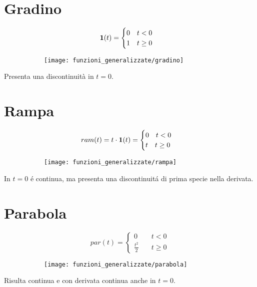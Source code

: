 \documentclass[../main.tex]{subfiles}
\begin{document}
	\section{Gradino}
		\begin{figure}[H]
			\centering
			\begin{subfigure}{0.4\textwidth}
				\[
					\textbf{1}(t) = 
					\begin{cases}
						0 \quad t<0
						\\
						1 \quad t \geq 0
					\end{cases}
				\]
			\end{subfigure}
			\begin{subfigure}{0.4\textwidth}
				\texttt{[image: funzioni\_generalizzate/gradino]}
			\end{subfigure}
		\end{figure}
		Presenta una discontinuità in $ t=0 $.
		
	\section{Rampa}
		\begin{figure}[H]
			\centering
			\begin{subfigure}{0.4\textwidth}
				\[
					ram(t)= t \cdot \textbf{1}(t) =
					\begin{cases}
						0 \quad t<0
						\\
						t \quad t \geq 0			
					\end{cases}
				\]
			\end{subfigure}
			\begin{subfigure}{0.4\textwidth}
				\texttt{[image: funzioni\_generalizzate/rampa]}
			\end{subfigure}
		\end{figure}
		In $ t=0 $ \'e continua, ma presenta una discontinuit\'a di prima specie nella derivata.
		
	\section{Parabola}
		\begin{figure}[H]
			\centering
			\begin{subfigure}{0.4\textwidth}
				\[
					par(t) = 
					\begin{cases}
						0 \quad &t<0
						\\
						\frac{t^2}{2} \quad &t\geq 0
					\end{cases}
				\]
			\end{subfigure}
			\begin{subfigure}{0.4\textwidth}
				\texttt{[image: funzioni\_generalizzate/parabola]}
			\end{subfigure}
		\end{figure}
		Risulta continua e con derivata continua anche in $ t=0 $.	
		
\end{document}
